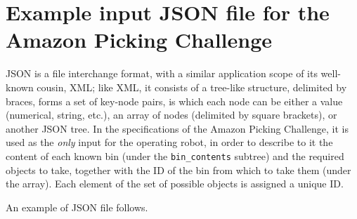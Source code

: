 \chapter{Example input JSON file for the Amazon Picking Challenge} \label{app:json}
JSON is a file interchange format, with a similar application scope of
its well-known cousin, XML; like XML, it consists of a tree-like
structure, delimited by braces, forms a set of key-node pairs, is which each node can be
either a value (numerical, string, etc.), an array of nodes (delimited
by square brackets), or another JSON tree. In the
specifications of the Amazon Picking Challenge, it is used as the
\emph{only} input for the operating robot, in order to describe to it the
content of each known bin (under the \texttt{bin\_contents} subtree) and
the required objects to take, together with the ID of the bin from
which to take them (under the  array). Each element of
the set of possible objects is assigned a unique ID.

An example of JSON file follows.

